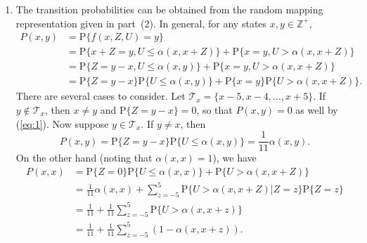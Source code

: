 \documentclass[12pt]{article}
\newcommand{\Prob}{\mathrm{P}}
\begin{document}
\begin{enumerate}
\item
The transition probabilities can be obtained from the random mapping representation given in part~(2). In general, for any states $x, y \in \mathbb{Z}^+$,
\begin{equation} \label{eq:1}
\begin{split}
P(x, y) &= \Prob \{f(x, Z, U) = y\} \\
&= \Prob \{x + Z = y, U \leq \alpha(x, x+Z)\} + \Prob \{x = y, U > \alpha(x, x+Z)\} \\
&= \Prob \{Z = y - x, U \leq \alpha(x, y)\} + \Prob \{x = y, U > \alpha(x, x+Z)\} \\
&= \Prob \{Z = y - x\} \Prob \{U \leq \alpha(x, y)\} + \Prob \{x = y\} \Prob \{U > \alpha(x, x+Z)\}.
\end{split}
\end{equation}
There are several cases to consider. Let $\mathcal{T}_x = \{x-5, x-4, \ldots, x+5\}$. If $y \not \in \mathcal{T}_x$, then $x \neq y$ and ${\Prob \{Z = y - x\} = 0}$, so that $P(x, y) = 0$ as well by (\ref{eq:1}). Now suppose $y \in \mathcal{T}_x$. If $y \neq x$, then
\begin{equation*}
P(x, y) = \Prob \{Z = y - x\} \Prob \{U \leq \alpha(x, y)\} = \frac{1}{11} \alpha(x, y).
\end{equation*}
On the other hand (noting that $\alpha(x, x) = 1$), we have
\begin{align*}
P(x, x) &= \Prob \{Z = 0\} \Prob \{U \leq \alpha(x, x)\} + \Prob \{U > \alpha(x, x+Z)\} \\
&= \frac{1}{11} \alpha(x, x) + \sum_{z=-5}^5 \Prob \{U > \alpha(x, x+Z) | Z = z\} \Prob \{Z = z\} \\
&= \frac{1}{11} + \frac{1}{11} \sum_{z=-5}^5 \Prob \{U > \alpha(x, x+z)\} \\
&= \frac{1}{11} + \frac{1}{11} \sum_{z=-5}^5 (1 - \alpha(x, x + z)).
\end{align*}


\end{enumerate}
\end{document}
